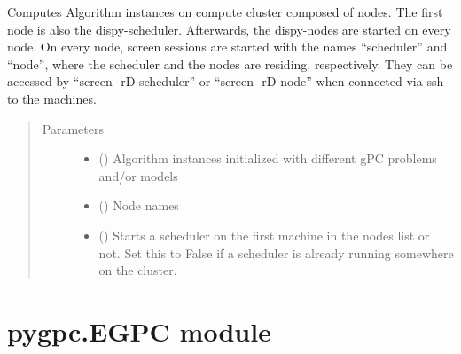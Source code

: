 \documentclass[letterpaper,10pt,english,openany,oneside]{sphinxmanual}
\begin{document}

\begin{fulllineitems}
\label{\detokenize{pygpc:pygpc.Computation.compute_cluster}}
Computes Algorithm instances on compute cluster composed of nodes. The first node is also the dispy-scheduler.
Afterwards, the dispy-nodes are started on every node. On every node, screen sessions are started with the names
“scheduler” and “node”, where the scheduler and the nodes are residing, respectively.
They can be accessed by “screen -rD scheduler” or “screen -rD node” when connected via ssh to the machines.
\begin{quote}\begin{description}
\item[{Parameters}] \leavevmode\begin{itemize}
\item {} 
 () \textendash{} Algorithm instances initialized with different gPC problems and/or models

\item {} 
 () \textendash{} Node names

\item {} 
 () \textendash{} Starts a scheduler on the first machine in the nodes list or not. Set this to False if a scheduler is already
running somewhere on the cluster.

\end{itemize}

\end{description}\end{quote}

\end{fulllineitems}



\section{pygpc.EGPC module}
\label{\detokenize{pygpc:module-pygpc.EGPC}}\label{\detokenize{pygpc:pygpc-egpc-module}}
\end{document}
